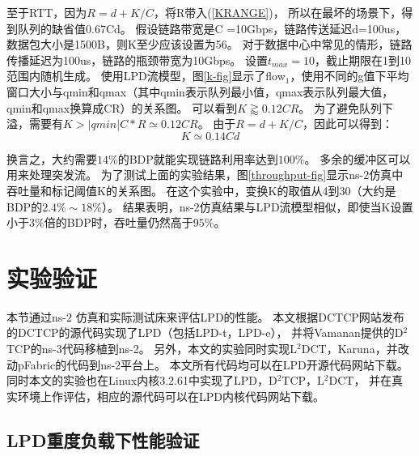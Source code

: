至于RTT，因为$R = d + K / C$，将R带入(\ref{KRANGE})，
所以在最坏的场景下，得到队列的缺省值0.67Cd。 
假设链路带宽是C =10Gbps，链路传送延迟d=100us，数据包大小是1500B，则K至少应该设置为56。
对于数据中心中常见的情形，链路传播延迟为100us，链路的瓶颈带宽为10Gbps。
设置$t_{max} = 10$，截止期限在1到10范围内随机生成。
使用LPD流模型，图\ref{k-fig}显示了flow$_1$，使用不同的g值下平均窗口大小与qmin和qmax（其中qmin表示队列最小值，qmax表示队列最大值，qmin和qmax换算成CR）的关系图。
可以看到$K\gtrapprox0.12CR$。
为了避免队列下溢，需要有$K > |qmin |C*R \simeq0.12CR$。  
由于$R=d+K/C$，因此可以得到：
\begin{equation}
\label{KVALUE}
K \simeq 0.14 Cd
\end{equation}

换言之，大约需要$14\%$的BDP就能实现链路利用率达到$100\%$。 
多余的缓冲区可以用来处理突发流。
为了测试上面的实验结果，图\ref{throughput-fig}显示ns-2仿真中吞吐量和标记阈值K的关系图。 
在这个实验中，变换K的取值从4到30（大约是BDP的$2.4\% \sim18\%$）。 
结果表明，ns-2仿真结果与LPD流模型相似，即使当K设置小于$3\%$倍的BDP时，吞吐量仍然高于$95\%$。 
 
\section{实验验证}\label{LPDevaluation}
本节通过ns-2 \cite{ns2}仿真和实际测试床来评估LPD的性能。 
本文根据DCTCP网站\cite{DCTCPcode}发布的DCTCP的源代码实现了LPD（包括LPD-t，LPD-e），
并将Vamanan\cite{D2TCP}提供的D$^2$TCP的ns-3代码移植到ns-2。 
另外，本文的实验同时实现L$^2$DCT，Karuna，并改动pFabric的代码到ns-2平台上。 
本文所有代码均可以在LPD开源代码网站\cite{LPD-sim-code}下载。 
同时本文的实验也在Linux内核3.2.61中实现了LPD，D$^2$TCP，L$^2$DCT，
并在真实环境上作评估，相应的源代码可以在LPD内核代码网站\cite{LPD-code}下载。

\subsection{LPD重度负载下性能验证}

